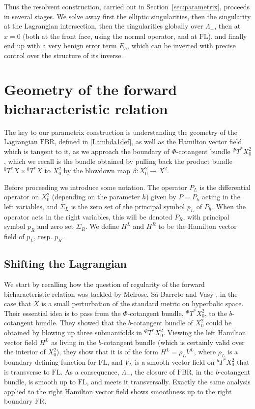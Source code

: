 \documentclass[10pt, a4paper, twoside]{amsart}
\numberwithin{equation}{section}
\theoremstyle{remark}
\begin{document}
Thus the resolvent construction, carried out in Section~\ref{sec:parametrix}, proceeds in several stages. We solve away first the elliptic singularities, then the singularity at the Lagrangian intersection, then the singularities globally over $\Lambda_+$, then at $x=0$ (both at the front face, using the normal operator, and at ${\mathrm{FL}}$), and finally end up with a very benign error term $E_h$, which can be inverted with precise control over the structure of its inverse. 

\section{Geometry of the forward bicharacteristic relation}\label{sec:flowout}

The key to our parametrix construction is understanding the geometry of the Lagrangian ${\mathrm{FBR}}$, defined in \eqref{Lambda1def}, as well as the Hamilton vector field which is tangent to it, as we approach the boundary of $\Phi$-cotangent bundle ${}^\Phi T^* X^2_0$, which we recall is the bundle obtained by pulling back the product bundle ${}^0 T^* X \times {}^0 T^* X$ to $X^2_0$ by the blowdown map $\beta : X^2_0 \to X^2$. 

Before proceeding we introduce some notation. The operator $P_L$ is the differential operator on $X^2_0$ (depending on the parameter $h$) given by $P = P_h$ acting in the left variables, and $\Sigma_L$ is the zero set of the principal symbol $p_L$ of $P_h$. 
When the operator acts in the right variables, this will be denoted $P_R$, with principal symbol $p_R$ and zero set $\Sigma_R$.
We define $H^L$ and $H^R$ to be the Hamilton vector field of $p_L$, resp. $p_R$. 

\subsection{Shifting the Lagrangian}\label{ssec:shift}

We start by recalling how the question of regularity of the forward bicharacteristic relation was tackled by Melrose, S\'{a} Barreto and Vasy \cite{Melrose-Sa Barreto-Vasy}, in the case that $X$ is a small perturbation of the standard metric on hyperbolic space. Their essential idea is to pass from the $\Phi$-cotangent bundle, ${}^\Phi T^* X^2_0$, to the $b$-cotangent bundle. 
They showed that the $b$-cotangent bundle of $X^2_0$ could be obtained by blowing up three submanifolds in ${}^\Phi T^* X^2_0$. Viewing the left Hamilton vector field $H^L$ as living in the $b$-cotangent bundle (which is certainly valid over the interior of $X^2_0$), they show that it is of the form $H^L = \rho_L V^L$, where $\rho_L$ is a boundary defining function for ${\mathrm{FL}}$, and $V_L$ is a smooth vector field on ${}^b T^* X^2_0$ that is transverse to ${\mathrm{FL}}$. As a consequence, $\Lambda_+$, the closure of ${\mathrm{FBR}}$, in the $b$-cotangent bundle, is smooth up to ${\mathrm{FL}}$, and meets it transversally. Exactly the same analysis applied to the right Hamilton vector field shows smoothness up to the right boundary ${\mathrm{FR}}$. 
\end{document}
